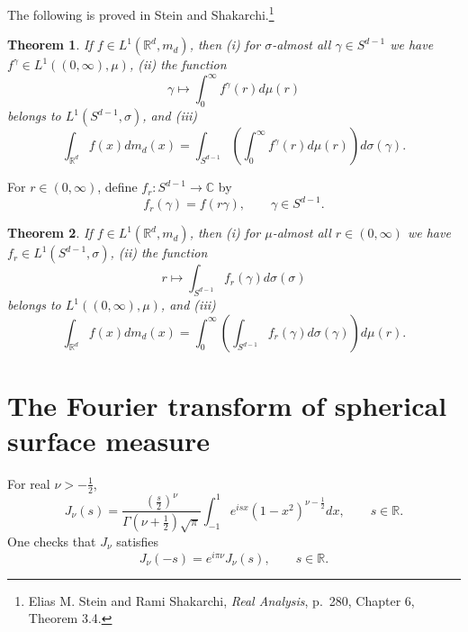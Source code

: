 \documentclass{article}
\newtheorem{theorem}{Theorem}
\begin{document}
The following is proved in Stein and Shakarchi.\footnote{Elias M. Stein and Rami Shakarchi, {\em Real Analysis}, 
p.~280, Chapter 6, Theorem 3.4.}

\begin{theorem}
If $f \in L^1(\mathbb{R}^d,m_d)$, then (i) for $\sigma$-almost all $\gamma \in S^{d-1}$ we have $f^\gamma \in L^1((0,\infty),\mu)$, 
(ii) the function
\[
\gamma \mapsto \int_0^\infty f^\gamma(r) d\mu(r)
\]
belongs to $L^1(S^{d-1},\sigma)$, and (iii)
\[
\int_{\mathbb{R}^d} f(x) dm_d(x) = \int_{S^{d-1}} \left( \int_0^\infty f^\gamma(r) d\mu(r) \right) d\sigma(\gamma).
\]
\end{theorem}

For $r \in (0,\infty)$, define $f_r:S^{d-1} \to \mathbb{C}$ by
\[
f_r(\gamma) = f(r\gamma), \qquad \gamma \in S^{d-1}.
\]

\begin{theorem}
If $f \in L^1(\mathbb{R}^d,m_d)$, then (i) for $\mu$-almost all $r \in (0,\infty)$ we have $f_r \in L^1(S^{d-1},\sigma)$, 
(ii) the function
\[
r \mapsto \int_{S^{d-1}} f_r(\gamma) d\sigma(\sigma)
\]
belongs to $L^1((0,\infty),\mu)$, and (iii)
\[
\int_{\mathbb{R}^d} f(x) dm_d(x) = \int_0^\infty \left( \int_{S^{d-1}}  f_r(\gamma) d\sigma(\gamma) \right) d\mu(r).
\]
\end{theorem}



\section{The Fourier transform of spherical surface measure}
For real $\nu>-\frac{1}{2}$,
\[
J_\nu(s) = \frac{\left(\frac{s}{2}\right)^\nu}{\Gamma\left(\nu+\frac{1}{2}\right)\sqrt{\pi}} \int_{-1}^1
e^{isx} (1-x^2)^{\nu-\frac{1}{2}} dx, \qquad s \in \mathbb{R}.
\]
One checks that $J_\nu$ satisfies
\[
J_\nu(-s)=e^{i\pi \nu} J_\nu(s), \qquad s \in \mathbb{R}.
\]
\end{document}
